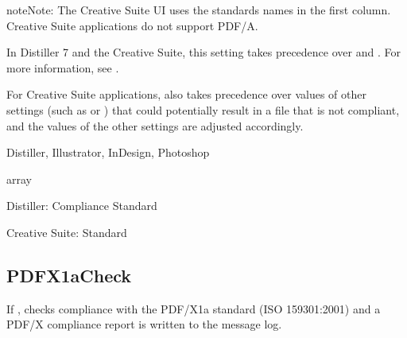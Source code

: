 \documentclass[letterpaper,12pt,english,openany,oneside]{sphinxmanual}
\begin{document}
\begin{sphinxadmonition}{note}{Note:}
The Creative Suite UI uses the standards names in the first column. Creative Suite applications do not support PDF/A.
\end{sphinxadmonition}

In Distiller 7 and the Creative Suite, this setting takes precedence over  and  . For more information, see .

For Creative Suite applications,  also takes precedence over values of other settings (such as  or  ) that could potentially result in a file that is not compliant, and the values of the other settings are adjusted accordingly.

\label{\detokenize{PDF_Create_CommonSettings:supported-by-108}}

Distiller, Illustrator, InDesign, Photoshop

\label{\detokenize{PDF_Create_CommonSettings:type-107}}

array

\label{\detokenize{PDF_Create_CommonSettings:ui-name-89}}

Distiller: Compliance Standard

Creative Suite: Standard

\label{\detokenize{PDF_Create_CommonSettings:default-value-102}}

\begin{sphinxVerbatim}[commandchars=\\\{\}]
\PYG{p}{[}\PYG{p}{]}
\end{sphinxVerbatim}




\subsection{PDFX1aCheck}
\label{\detokenize{PDF_Create_CommonSettings:pdfx1acheck}}
If  , checks compliance with the PDF/X\sphinxhyphen{}1a standard (ISO 15930\sphinxhyphen{}1:2001) and a PDF/X compliance report is written to the message log.
\end{document}
